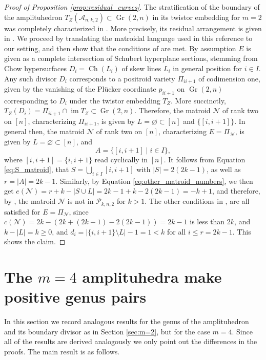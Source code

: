\documentclass[12pt]{extarticle}
\theoremstyle{definition}
\theoremstyle{theorem}
\theoremstyle{remark}
\numberwithin{equation}{section}
\newcommand{\im}{\operatorname{im}}
\DeclareMathOperator{\gr}{Gr}
\newcommand{\aA}{\mathcal{A}}
\newcommand{\CH}{\operatorname{Ch}}
\begin{document}
\begin{proof}[Proof of Proposition \ref{prop:residual_curves}]
    The stratification of the boundary of the amplituhedron $T_Z(\aA_{n,k,2})\subset \gr(2,n)$ in its twistor embedding for $m=2$ was completely characterized in \cite{lam_face_structure}.
    More precisely, its residual arrangement is given in \cite[Proposition 38]{lam_face_structure}.
    We proceed by translating the matroidal language used in this reference to our setting, and then show that the conditions of \cite[Proposition 38]{lam_face_structure} are met.
    By assumption $E$ is given as a complete intersection of Schubert hyperplane sections, stemming from Chow hypersurfaces $D_i=\CH(L_i)$ of skew lines $L_i$ in general position for $i\in I$.
    Any such divisor $D_i$ corresponds to a positroid variety $\Pi_{ii+1}$ of codimension one, given by the vanishing of the Pl\"ucker coordinate $p_{ii+1}$ on $\gr(2,n)$ corresponding to $D_i$ under the twistor embedding $T_Z$.
    More succinctly, $T_Z(D_i)= \Pi_{ii+1}\cap \im T_Z\subset \gr(2,n)$.
    Therefore, the matroid $\mathcal{N}$ of rank two on $[n]$, characterizing $\Pi_{ii+1}$, is given by $L=\varnothing\subset [n]$ and $\{[i,i+1]\}$.
    In general then, the matroid $\mathcal{N}$ of rank two on $[n]$, characterizing $E=\Pi_\mathcal N$, is given by $L=\varnothing\subset [n]$, and 
    \[
    A = \{[i,i+1]\mid i\in I\},
    \]
    where $[i,i+1]=\{i,i+1\}$ read cyclically in $[n]$.
    It follows from Equation \eqref{eq:S_matroid}, that $S=\bigcup_{i\in I}[i,i+1]$ with $|S|=2(2k-1)$, as well as $r=|A|=2k-1$.
    Similarly, by Equation \eqref{eq:other_matroid_numbers}, we then get $e(\mathcal N)=r+k-|S\cup L|=2k-1+k-2(2k-1)=-k+1$, and therefore, by \cite[Theorem 16]{lam_face_structure}, the matroid $\mathcal{N}$ is not in $\mathcal{P}_{k,n,2}$ for $k>1$.
    The other conditions in \cite[Proposition 38]{lam_face_structure}, are all satisfied for $E=\Pi_{\mathcal N}$, since $c(\mathcal{N})=2k-(2k+(2k-1)-2(2k-1))=2k-1$ is less than $2k$, and $k-|L|=k\geq 0$, and $d_i=|\{i,i+1\}\setminus L|-1=1<k$ for all $i\leq r=2k-1$.
    This shows the claim.
\end{proof}

\section{The $m=4$ amplituhedra make positive genus pairs}
\label{sec:m=4}

In this section we record analogous results for the genus of the amplituhedron and its boundary divisor as in Section \ref{sec:m=2}, but for the case $m=4$. Since all of the results are derived analogously we only point out the differences in the proofs. The main result is as follows.
\end{document}
